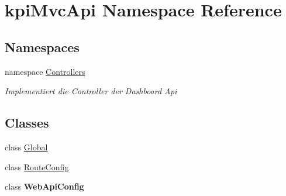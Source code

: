 \hypertarget{namespacekpi_mvc_api}{}\section{kpi\+Mvc\+Api Namespace Reference}
\label{namespacekpi_mvc_api}
\subsection*{Namespaces}
\begin{DoxyCompactItemize}
\item 
namespace \hyperlink{namespacekpi_mvc_api_1_1_controllers}{Controllers}
\begin{DoxyCompactList}\small\item\em Implementiert die Controller der Dashboard Api \end{DoxyCompactList}\end{DoxyCompactItemize}
\subsection*{Classes}
\begin{DoxyCompactItemize}
\item 
class \hyperlink{classkpi_mvc_api_1_1_global}{Global}
\item 
class \hyperlink{classkpi_mvc_api_1_1_route_config}{Route\+Config}
\item 
class {\bfseries Web\+Api\+Config}
\end{DoxyCompactItemize}
